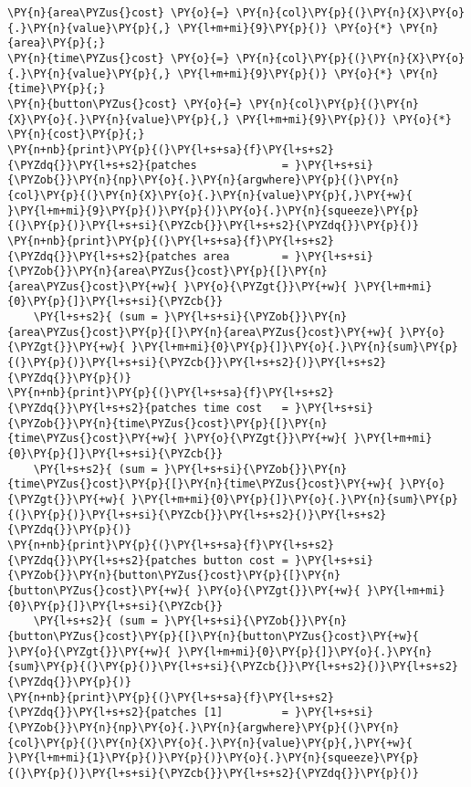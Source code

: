 \begin{tcolorbox}[breakable, size=fbox, boxrule=1pt, pad at break*=1mm,colback=cellbackground, colframe=cellborder]
\begin{Verbatim}[commandchars=\\\{\}]
\PY{n}{area\PYZus{}cost} \PY{o}{=} \PY{n}{col}\PY{p}{(}\PY{n}{X}\PY{o}{.}\PY{n}{value}\PY{p}{,} \PY{l+m+mi}{9}\PY{p}{)} \PY{o}{*} \PY{n}{area}\PY{p}{;}
\PY{n}{time\PYZus{}cost} \PY{o}{=} \PY{n}{col}\PY{p}{(}\PY{n}{X}\PY{o}{.}\PY{n}{value}\PY{p}{,} \PY{l+m+mi}{9}\PY{p}{)} \PY{o}{*} \PY{n}{time}\PY{p}{;}
\PY{n}{button\PYZus{}cost} \PY{o}{=} \PY{n}{col}\PY{p}{(}\PY{n}{X}\PY{o}{.}\PY{n}{value}\PY{p}{,} \PY{l+m+mi}{9}\PY{p}{)} \PY{o}{*} \PY{n}{cost}\PY{p}{;}
\PY{n+nb}{print}\PY{p}{(}\PY{l+s+sa}{f}\PY{l+s+s2}{\PYZdq{}}\PY{l+s+s2}{patches             = }\PY{l+s+si}{\PYZob{}}\PY{n}{np}\PY{o}{.}\PY{n}{argwhere}\PY{p}{(}\PY{n}{col}\PY{p}{(}\PY{n}{X}\PY{o}{.}\PY{n}{value}\PY{p}{,}\PY{+w}{ }\PY{l+m+mi}{9}\PY{p}{)}\PY{p}{)}\PY{o}{.}\PY{n}{squeeze}\PY{p}{(}\PY{p}{)}\PY{l+s+si}{\PYZcb{}}\PY{l+s+s2}{\PYZdq{}}\PY{p}{)}
\PY{n+nb}{print}\PY{p}{(}\PY{l+s+sa}{f}\PY{l+s+s2}{\PYZdq{}}\PY{l+s+s2}{patches area        = }\PY{l+s+si}{\PYZob{}}\PY{n}{area\PYZus{}cost}\PY{p}{[}\PY{n}{area\PYZus{}cost}\PY{+w}{ }\PY{o}{\PYZgt{}}\PY{+w}{ }\PY{l+m+mi}{0}\PY{p}{]}\PY{l+s+si}{\PYZcb{}}
    \PY{l+s+s2}{ (sum = }\PY{l+s+si}{\PYZob{}}\PY{n}{area\PYZus{}cost}\PY{p}{[}\PY{n}{area\PYZus{}cost}\PY{+w}{ }\PY{o}{\PYZgt{}}\PY{+w}{ }\PY{l+m+mi}{0}\PY{p}{]}\PY{o}{.}\PY{n}{sum}\PY{p}{(}\PY{p}{)}\PY{l+s+si}{\PYZcb{}}\PY{l+s+s2}{)}\PY{l+s+s2}{\PYZdq{}}\PY{p}{)}
\PY{n+nb}{print}\PY{p}{(}\PY{l+s+sa}{f}\PY{l+s+s2}{\PYZdq{}}\PY{l+s+s2}{patches time cost   = }\PY{l+s+si}{\PYZob{}}\PY{n}{time\PYZus{}cost}\PY{p}{[}\PY{n}{time\PYZus{}cost}\PY{+w}{ }\PY{o}{\PYZgt{}}\PY{+w}{ }\PY{l+m+mi}{0}\PY{p}{]}\PY{l+s+si}{\PYZcb{}}
    \PY{l+s+s2}{ (sum = }\PY{l+s+si}{\PYZob{}}\PY{n}{time\PYZus{}cost}\PY{p}{[}\PY{n}{time\PYZus{}cost}\PY{+w}{ }\PY{o}{\PYZgt{}}\PY{+w}{ }\PY{l+m+mi}{0}\PY{p}{]}\PY{o}{.}\PY{n}{sum}\PY{p}{(}\PY{p}{)}\PY{l+s+si}{\PYZcb{}}\PY{l+s+s2}{)}\PY{l+s+s2}{\PYZdq{}}\PY{p}{)}
\PY{n+nb}{print}\PY{p}{(}\PY{l+s+sa}{f}\PY{l+s+s2}{\PYZdq{}}\PY{l+s+s2}{patches button cost = }\PY{l+s+si}{\PYZob{}}\PY{n}{button\PYZus{}cost}\PY{p}{[}\PY{n}{button\PYZus{}cost}\PY{+w}{ }\PY{o}{\PYZgt{}}\PY{+w}{ }\PY{l+m+mi}{0}\PY{p}{]}\PY{l+s+si}{\PYZcb{}}
    \PY{l+s+s2}{ (sum = }\PY{l+s+si}{\PYZob{}}\PY{n}{button\PYZus{}cost}\PY{p}{[}\PY{n}{button\PYZus{}cost}\PY{+w}{ }\PY{o}{\PYZgt{}}\PY{+w}{ }\PY{l+m+mi}{0}\PY{p}{]}\PY{o}{.}\PY{n}{sum}\PY{p}{(}\PY{p}{)}\PY{l+s+si}{\PYZcb{}}\PY{l+s+s2}{)}\PY{l+s+s2}{\PYZdq{}}\PY{p}{)}
\PY{n+nb}{print}\PY{p}{(}\PY{l+s+sa}{f}\PY{l+s+s2}{\PYZdq{}}\PY{l+s+s2}{patches [1]         = }\PY{l+s+si}{\PYZob{}}\PY{n}{np}\PY{o}{.}\PY{n}{argwhere}\PY{p}{(}\PY{n}{col}\PY{p}{(}\PY{n}{X}\PY{o}{.}\PY{n}{value}\PY{p}{,}\PY{+w}{ }\PY{l+m+mi}{1}\PY{p}{)}\PY{p}{)}\PY{o}{.}\PY{n}{squeeze}\PY{p}{(}\PY{p}{)}\PY{l+s+si}{\PYZcb{}}\PY{l+s+s2}{\PYZdq{}}\PY{p}{)}

\end{Verbatim}
\end{tcolorbox}
